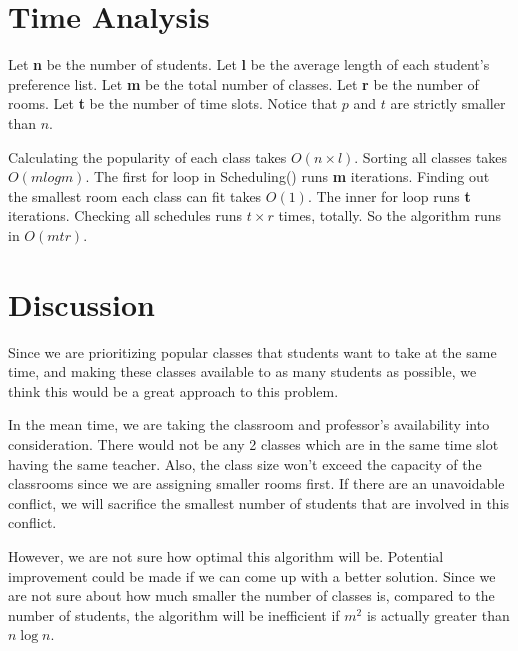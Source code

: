 \documentclass[11pt, oneside]{article}   	%
\begin{document}
\begin{algorithm}[H]

\end{algorithm}
\section{Time Analysis}
Let \textbf{n} be the number of students. 
Let \textbf{l} be the average length of each student's preference list.
Let \textbf{m} be the total number of classes. 
Let \textbf{r} be the number of rooms. 
Let \textbf{t} be the number of time slots. 
Notice that $p$ and $t$ are strictly smaller than $n$.

Calculating the popularity of each class takes $O(n\times l)$. Sorting all classes takes $O(mlogm)$. The first for loop in Scheduling() runs \textbf{m} iterations. Finding out the smallest room each class can fit takes $O(1)$. The inner for loop runs \textbf{t} iterations. Checking all schedules runs $t \times r$ times, totally. So the algorithm runs in $O(mtr)$.


\section{Discussion}
Since we are prioritizing popular classes that students want to take at the same time, and making these classes available to as many students as possible, we think this would be a great approach to this problem.

In the mean time, we are taking the classroom and professor's availability into consideration. There would not be any 2 classes which are in the same time slot having the same teacher. Also, the class size won't exceed the capacity of the classrooms since we are assigning smaller rooms first. If there are an unavoidable conflict, we will sacrifice the smallest number of students that are involved in this conflict.

However, we are not sure how optimal this algorithm will be. Potential improvement could be made if we can come up with a better solution. Since we are not sure about how much smaller the number of classes is, compared to the number of students, the algorithm will be inefficient if $m^2$ is actually greater than $n \log n$.
\end{document}
